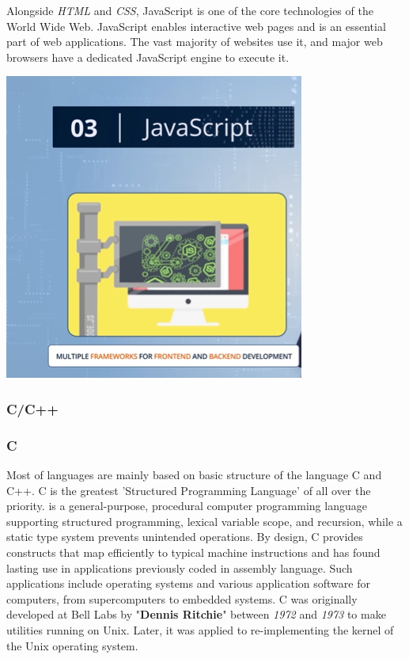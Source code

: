 \documentclass[paper = A5, headinclude, parskip = full, oneside, font = 11 pt]{report}
\begin{document}
Alongside \textit{HTML} and \textit{CSS}, JavaScript is one of the core technologies of the World Wide Web. JavaScript enables interactive web pages and is an essential part of web applications. The vast majority of websites use it, and major web browsers have a dedicated JavaScript engine to execute it.
\begin{center}
 \includegraphics[width = 140 pt]{JavaScript.png}
\end{center}

\subsubsection{C/C++}
\subsubsection{C}
Most of languages are mainly based on basic structure of the language C and C++. C is the greatest 'Structured Programming Language' of all over the priority. is a general-purpose, procedural computer programming language supporting structured programming, lexical variable scope, and recursion, while a static type system prevents unintended operations. By design, C provides constructs that map efficiently to typical machine instructions and has found lasting use in applications previously coded in assembly language. Such applications include operating systems and various application software for computers, from supercomputers to embedded systems. C was originally developed at Bell Labs by "\textbf{Dennis Ritchie}" between \textit{1972} and \textit{1973} to make utilities running on Unix. Later, it was applied to re-implementing the kernel of the Unix operating system.
\end{document}
